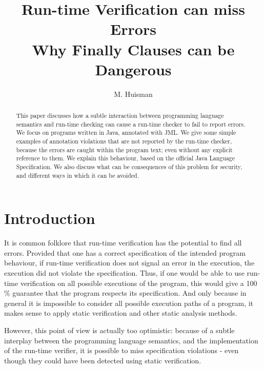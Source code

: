 \documentclass[]{llncs}
\title{Run-time Verification can miss Errors\\{\large Why Finally
Clauses can be Dangerous}}
\author{M. Huisman}
\institute{INRIA Sophia Antipolis-Mediterran\'ee, France}
\begin{document}
\maketitle

\begin{abstract}
This paper discusses how a subtle interaction between programming
language semantics and run-time checking can cause a run-time checker
to fail to report errors. We focus on programs written in Java,
annotated with JML. We give some simple examples of annotation
violations that are not reported by the run-time checker, because the
errors are caught within the program text; even without any explicit
reference to them. We explain this behaviour, based on the official
Java Language Specification. We also discuss what can be consequences
of this problem for security, and different ways in which it can be
avoided.

\end{abstract}

\section{Introduction}

It is common folklore that run-time verification has the potential to
find all errors. Provided that one has a correct specification of the
intended program behaviour, if run-time verification does not signal
an error in the execution, the execution did not violate the
specification. Thus, if one would be able to use run-time verification
on all possible executions of the program, this would give a 100 \%
guarantee that the program respects its specification. And only
because in general it is impossible to consider all possible execution
paths of a program, it makes sense to apply static verification and
other static analysis methods.

However, this point of view is actually too optimistic: because of a
subtle interplay between the programming language semantics, and the
implementation of the run-time verifier, it is possible to miss
specification violations - even though they could have been detected
using static verification.
\end{document}
